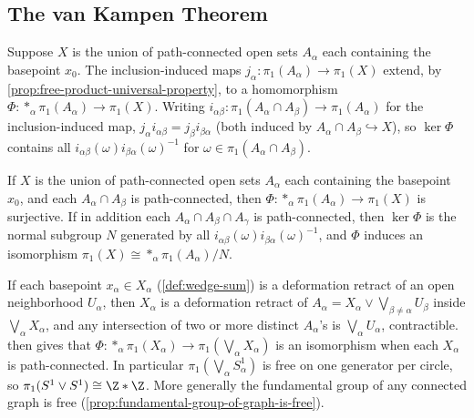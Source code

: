 \subsection*{The van Kampen Theorem}

Suppose $X$ is the union of path-connected open sets $A_\alpha$ each containing the
basepoint $x_0$. The inclusion-induced maps $j_\alpha : \pi_1(A_\alpha) \to \pi_1(X)$ extend, by
\cref{prop:free-product-universal-property}, to a homomorphism
$\Phi : *_\alpha \pi_1(A_\alpha) \to \pi_1(X)$. Writing $i_{\alpha\beta} : \pi_1(A_\alpha\cap A_\beta) \to \pi_1(A_\alpha)$ for the
inclusion-induced map, $j_\alpha i_{\alpha\beta} = j_\beta i_{\beta\alpha}$ (both induced by $A_\alpha\cap A_\beta \hookrightarrow X$), so
$\ker\Phi$ contains all $i_{\alpha\beta}(\omega)i_{\beta\alpha}(\omega)^{-1}$ for $\omega \in \pi_1(A_\alpha\cap A_\beta)$.

\begin{theorem}
\label{thm:van-kampen-theorem}
If $X$ is the union of path-connected open sets $A_\alpha$ each containing the
basepoint $x_0$, and each $A_\alpha \cap A_\beta$ is path-connected, then
$\Phi : *_\alpha \pi_1(A_\alpha) \to \pi_1(X)$ is surjective. If in addition each
$A_\alpha \cap A_\beta \cap A_\gamma$ is path-connected, then $\ker\Phi$ is the normal subgroup $N$
generated by all $i_{\alpha\beta}(\omega)i_{\beta\alpha}(\omega)^{-1}$, and $\Phi$ induces an isomorphism
$\pi_1(X) \cong *_\alpha \pi_1(A_\alpha) / N$.
\end{theorem}

\begin{example}
\label{ex:wedge-sum-fundamental-group}
If each basepoint $x_\alpha \in X_\alpha$ (\cref{def:wedge-sum}) is a deformation retract of an
open neighborhood $U_\alpha$, then $X_\alpha$ is a deformation retract of
$A_\alpha = X_\alpha \vee \bigvee_{\beta\ne\alpha} U_\beta$ inside $\bigvee_\alpha X_\alpha$, and any intersection of two or
more distinct $A_\alpha$'s is $\bigvee_\alpha U_\alpha$, contractible.  then
gives that $\Phi : *_\alpha \pi_1(X_\alpha) \to \pi_1(\bigvee_\alpha X_\alpha)$ is an isomorphism when each $X_\alpha$
is path-connected. In particular $\pi_1(\bigvee_\alpha S^1_\alpha)$ is free on one generator per circle,
so $\pi_1(S^1\vee S^1) \cong \Z*\Z$. More generally the fundamental group of any
connected graph is free (\cref{prop:fundamental-group-of-graph-is-free}).
\end{example}

